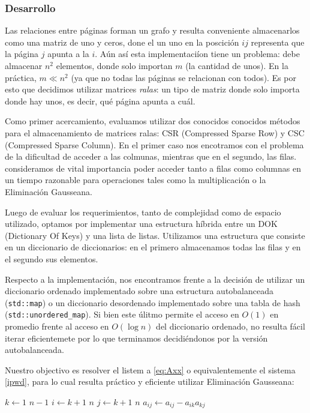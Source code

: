 \subsubsection*{Desarrollo}

\par Las relaciones entre p\'aginas forman un grafo y resulta conveniente almacenarlos como una
matriz de uno y ceros, done el un uno en la poscici\'on $ij$ representa que la p\'agina $j$ apunta a la $i$.
A\'un as\'i esta implementaci\'ion tiene un problema: debe almacenar $n^2$ elementos, donde solo importan
$m$ (la cantidad de unos). En la pr\'actica, $m \ll n^2$ (ya que no todas las p\'aginas se relacionan
con todos). Es por esto que decidimos utilizar matrices \textit{ralas}: un tipo de matriz donde solo
importa donde hay unos, es decir, qu\'e p\'agina apunta a cu\'al.
\par Como primer acercamiento, evaluamos utilizar dos conocidos conocidos m\'etodos para el almacenamiento
de matrices ralas: CSR (Compressed Sparse Row) y CSC (Compressed Sparse Column). En el primer caso
nos encotramos con el problema de la dificultad de acceder a las colmunas, mientras que en el segundo,
las filas. consideramos de vital importancia poder acceder tanto a filas como columnas en un tiempo
razonable para operaciones tales como la multiplicación o la Eliminación Gausseana.
\par Luego de evaluar los requerimientos, tanto de complejidad como de espacio utilizado, optamos
por implementar una estructura h\'ibrida entre un DOK (Dictionary Of Keys) y una lista de listas. 
Utilizamos una estructura que consiste en un diccionario de diccionarios: en el primero almacenamos
todas las filas y en el segundo sus elementos.
\par Respecto a la implementaci\'on, nos encontramos frente a la decisión de utilizar un diccionario ordenado
implementado sobre una estructura autobalanceada (\verb|std::map|) o un diccionario desordenado
implementado sobre una tabla de hash (\verb|std::unordered_map|). Si bien este \'ulitmo permite
el acceso en $O(1)$ en promedio frente al acceso en $O(\log n)$ del diccionario ordenado, 
no resulta f\'acil iterar eficientemete por lo que terminamos decidi\'endonos por la versi\'on autobalanceada.
\par Nuestro objectivo es resolver el listem a \ref{eq:Axx} o equivalentemente el sistema \ref{ipwd}, para lo cual 
resulta pr\'actico y eficiente utilizar Eliminación Gausseana:

\begin{codebox}
\li \For $k \gets 1$ \To $n-1$
    \Do
\li     \For $i \gets k+1$ \To $n$
            \Do
\li         \For $j \gets k+1$ \To $n$
                \Do
\li                 $a_{ij} \gets a_{ij} - a_{ik}a_{kj}$
                \End
            \End
        \End
\end{codebox}

